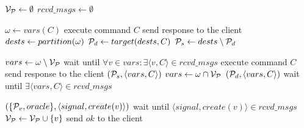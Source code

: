 \begin{algorithm}[htbp!]
\footnotesize

\begin{distribalgo}[1]


\STATE $\mathcal{V}_{\mathcal{P}} \leftarrow \emptyset$
\STATE $rcvd\_msgs \leftarrow \emptyset$
\ENDINDENT

	\STATE $\omega \leftarrow vars(C)$
		\STATE execute command $C$
		\STATE send response to the client
		\STATE $dests \leftarrow partition(\omega)$
		\STATE $\mathcal{P}_d \leftarrow target(dests, C)$
		\STATE $\mathcal{P}_s \leftarrow dests \setminus \mathcal{P}_d$

			\STATE $vars \leftarrow \omega \setminus \mathcal{V}_{\mathcal{P}}$
			\STATE wait until $\forall v \in vars: \exists \langle v, C \rangle \in rcvd\_msgs$
			\STATE execute command $C$
			\STATE send response to the client
			\STATE \rmcast$(\mathcal{P}_s, \langle vars, C\rangle)$
			\STATE $vars \leftarrow \omega \cap \mathcal{V}_{\mathcal{P}}$
			\STATE \rmcast$(\mathcal{P}_d, \langle vars, C \rangle)$
			\STATE wait until $\exists \langle vars, C \rangle \in rcvd\_msgs$
		\ENDIF
	\ENDIF
\ENDINDENT

\vspace{1.0mm}

\vspace{1.0mm}
	\STATE \rmcast$(\{\mathcal{P}_v, oracle\}, \langle signal, create(v) \rangle)$
	\STATE wait until $\langle signal, create(v) \rangle \in rcvd\_msgs$
	\STATE $\mathcal{V}_{\mathcal{P}} \leftarrow \mathcal{V}_{\mathcal{P}} \cup \{v\}$
	\STATE send $ok$ to the client
\ENDINDENT


\end{distribalgo}
\end{algorithm}
